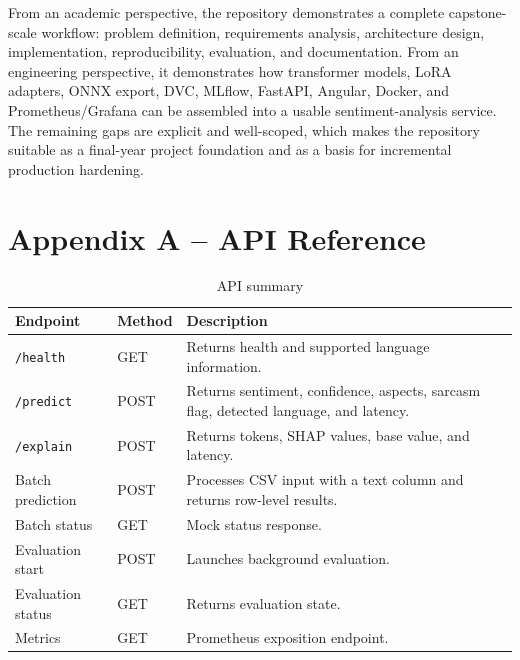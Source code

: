 \documentclass[12pt, a4paper]{article}
\begin{document}
From an academic perspective, the repository demonstrates a complete capstone-scale workflow: problem definition, requirements analysis, architecture design, implementation, reproducibility, evaluation, and documentation. From an engineering perspective, it demonstrates how transformer models, LoRA adapters, ONNX export, DVC, MLflow, FastAPI, Angular, Docker, and Prometheus/Grafana can be assembled into a usable sentiment-analysis service. The remaining gaps are explicit and well-scoped, which makes the repository suitable as a final-year project foundation and as a basis for incremental production hardening.

\appendix

\section{Appendix A -- API Reference}
\begin{table}[H]
\centering
\caption{API summary}
\begin{tabularx}{\textwidth}{@{} p{3cm} p{2cm} X @{}}
\toprule
\textbf{Endpoint} & \textbf{Method} & \textbf{Description} \\
\midrule
\texttt{/health} & GET & Returns health and supported language information. \\
\texttt{/predict} & POST & Returns sentiment, confidence, aspects, sarcasm flag, detected language, and latency. \\
\texttt{/explain} & POST & Returns tokens, SHAP values, base value, and latency. \\
Batch prediction & POST & Processes CSV input with a text column and returns row-level results. \\
Batch status & GET & Mock status response. \\
Evaluation start & POST & Launches background evaluation. \\
Evaluation status & GET & Returns evaluation state. \\
Metrics & GET & Prometheus exposition endpoint. \\
\bottomrule
\end{tabularx}
\end{table}
\end{document}
